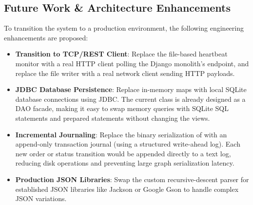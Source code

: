 \subsection{Future Work \& Architecture Enhancements}
To transition the system to a production environment, the following engineering enhancements are proposed:
\begin{itemize}
    \item \textbf{Transition to TCP/REST Client}: Replace the file-based heartbeat monitor with a real HTTP client polling the Django monolith's  endpoint, and replace the  file writer with a real network client sending HTTP  payloads.
    \item \textbf{JDBC Database Persistence}: Replace in-memory maps with local SQLite database connections using JDBC. 
    The current  class is already designed as a DAO facade, making it easy to swap memory queries with SQLite SQL statements and prepared statements without changing the views.
    \item \textbf{Incremental Journaling}: Replace the binary serialization of  with an append-only transaction journal (using a structured write-ahead log). 
    Each new order or status transition would be appended directly to a text log, reducing disk operations and preventing large graph serialization latency.
    \item \textbf{Production JSON Libraries}: Swap the custom recursive-descent parser for established JSON libraries like Jackson or Google Gson to handle complex JSON variations.
\end{itemize}

